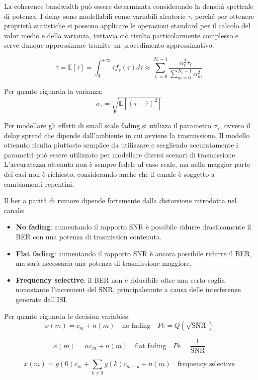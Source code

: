 La coherence bandwidth può essere determinata considerando la densità spettrale di potenza.
I delay sono modellabili come variabili aleatorie $\tau$, perché per ottenere proprietà statistiche si possono applicare le operazioni standard per il calcolo del valor medio e della varianza, tuttavia ciò risulta particolarmente complesso e serve dunque approssimare tramite un procedimento approssimativo.


\[
   \overline{\tau} = \mathbb{E} \left[\tau\right] = \int_{0}^{+\infty} \tau f_{\tau}(\tau) d\tau \approx \sum_{\ell=0}^{N_c-1} \frac{\alpha_{\ell}^2 \tau_{\ell}}{\sum_{m=0}^{N_c-1} \alpha_{m}^2}
\]

Per quanto riguarda la varianza:
\[  
    \sigma_\tau = \sqrt{\mathbb{E}\left[({\tau - \overline{\tau}})^2\right]}
\]

Per modellare gli effetti di small scale fading si utilizza il parametro $\sigma_\tau$, ovvero il delay spread che dipende dall'ambiente in cui avviene la trasmissione. Il modello ottenuto risulta piuttosto semplice da utilizzare e secgliendo accuratamente i parametri può essere utilizzato per modellare diversi scenari di trasmissione. L'accuratezza ottenuta non è sempre fedele al caso reale, ma nella maggior parte dei casi non è richiesto, considerando anche che il canale è soggetto a cambiamenti repentini.

Il ber a parità di rumore dipende fortemente dalla distorsione introdotta nel canale:
\begin{itemize}
    \item \textbf{No fading}: aumentando il rapporto SNR è possibile ridurre drasticamente il BER con una potenza di trasmission contenuta.
    \item \textbf{Flat fading}: aumentando il rapporto SNR è ancora possibile ridurre il BER, ma sarà necessaria una potenza di trasmissione maggiore.
    \item \textbf{Frequency selective}: il BER non è riducibile oltre una certa soglia nonostante l'increment del SNR, principalemnte a causa delle interferenze generate dall'ISI.
\end{itemize}

Per quanto riguarda le decision variables:
\[
    x(m) = c_m + n(m) \quad \text{no fading} \quad Pe = Q(\sqrt{\text{SNR}})
\]

\[
    x(m) = \alpha c_m + n(m) \quad \text{flat fading} \quad Pe = \frac{1}{\text{SNR}}
\]

\[
    x(m) = g(0) c_m + \sum_{k \neq 0} g(k) c_{m-k} + n(m) \quad \text{frequency selective}  
\]


